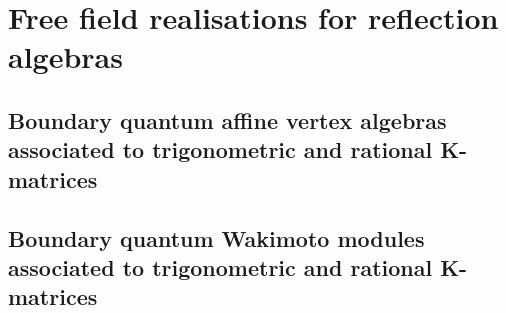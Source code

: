 \section{Free field realisations for reflection algebras}
    \subsection{Boundary quantum affine vertex algebras associated to trigonometric and rational K-matrices}

    \subsection{Boundary quantum Wakimoto modules associated to trigonometric and rational K-matrices}